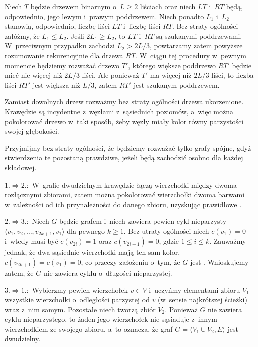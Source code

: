 \exercise %

\noindent Niech $T$ będzie drzewem binarnym o~$L\ge2$ liściach oraz niech $LT$ i~$RT$ będą, odpowiednio, jego lewym i~prawym poddrzewem. Niech ponadto $L_1$ i~$L_2$ stanowią, odpowiednio, liczbę liści $LT$ i~liczbę liści $RT$. Bez straty ogólności załóżmy, że $L_1\le L_2$. Jeśli $2L_1\ge L_2$, to $LT$ i~$RT$ są szukanymi poddrzewami. W~przeciwnym przypadku zachodzi $L_2>2L/3$, powtarzamy zatem powyższe rozumowanie rekurencyjnie dla drzewa $RT$. W~ciągu tej procedury w~pewnym momencie będziemy rozważać drzewo $T'$, którego większe poddrzewo $RT'$ będzie mieć nie więcej niż $2L/3$ liści. Ale ponieważ $T'$ ma więcej niż $2L/3$ liści, to liczba liści $RT'$ jest większa niż $L/3$, zatem $RT'$ jest szukanym poddrzewem.

\problems


\subproblem %
Zamiast dowolnych drzew rozważmy bez straty ogólności drzewa ukorzenione. Krawędzie są incydentne z~węzłami z~sąsiednich poziomów, a~więc można pokolorować drzewo w~taki sposób, żeby węzły miały kolor równy parzystości swojej głębokości.

\subproblem %
Przyjmijmy bez straty ogólności, że będziemy rozważać tylko grafy spójne, gdyż stwierdzenia te pozostaną prawdziwe, jeżeli będą zachodzić osobno dla każdej składowej.
\bigskip

$1.\Rightarrow 2.\!\!:$ W~grafie dwudzielnym krawędzie łączą wierzchołki między dwoma rozłącznymi zbiorami, zatem można pokolorować wierzchołki dwoma barwami w~zależności od ich przynależności do danego zbioru, uzyskując prawidłowe .
\bigskip

$2.\Rightarrow 3.\!\!:$ Niech $G$ będzie grafem  i~niech zawiera pewien cykl nieparzysty $\langle v_1,v_2,\dots,v_{2k+1},v_1\rangle$ dla pewnego $k\ge1$. Bez utraty ogólności niech $c(v_1)=0$ i~wtedy musi być $c(v_{2i})=1$ oraz $c(v_{2i+1})=0$, gdzie $1\le i\le k$. Zauważmy jednak, że dwa sąsiednie wierzchołki mają ten sam kolor, $c(v_{2k+1})=c(v_1)=0$, co przeczy założeniu o~tym, że $G$ jest . Wnioskujemy zatem, że $G$ nie zawiera cyklu o~długości nieparzystej.
\bigskip

$3.\Rightarrow 1.\!\!:$ Wybierzmy pewien wierzchołek $v\in V$ i~uczyńmy elementami zbioru $V_1$ wszystkie wierzchołki o~odległości parzystej od $v$ (w~sensie najkrótszej ścieżki) wraz z~nim samym. Pozostałe niech tworzą zbiór $V_2$. Ponieważ $G$ nie zawiera cyklu nieparzystego, to żaden jego wierzchołek nie sąsiaduje z~innym wierzchołkiem ze swojego zbioru, a~to oznacza, że graf $G=\langle V_1\cup V_2,E\rangle$ jest dwudzielny.

